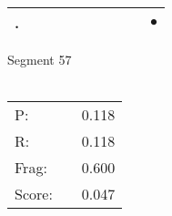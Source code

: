 \documentclass[landscape]{article}
\newcommand{\ssp}{\hspace{2pt}}
\newcommand{\mex}{\cellcolor{g}$\bullet$}
\begin{document}
\begin{tabular}{|l|p{10pt}|p{10pt}|p{10pt}|p{10pt}|p{10pt}|p{10pt}|p{10pt}|p{10pt}|p{10pt}|}
\hline
\ssp \cellcolor{ref8}. \ssp&\hspace{2pt}&\hspace{2pt}&\hspace{2pt}&\hspace{2pt}&\hspace{2pt}&\hspace{2pt}&\hspace{2pt}&\hspace{2pt}&\hspace{2pt}\mex\\
\hline
\end{tabular}

\vspace{6pt}
\noindent Segment 57\\\\
\noindent\begin{tabular}{lm{12pt}r}
\hline
P:&&0.118\\
R:&&0.118\\
Frag:&&0.600\\
Score:&&0.047\\
\end{tabular}

\newpage
\end{document}
